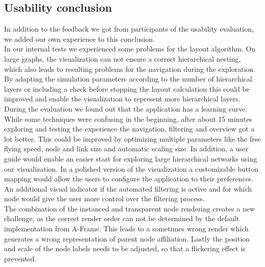 \subsection{Usability conclusion}
In addition to the feedback we got from participants of the usability evaluation, we added our own experience to this conclusion.
\\
In our internal tests we experienced some problems for the layout algorithm. 
On large graphs, the visualization can not ensure a correct hierarchical nesting, which also leads to resulting problems for the navigation during the exploration. 
By adapting the simulation parameters according to the number of hierarchical layers or including a check before stopping the layout calculation this could be improved and enable the visualization to represent more hierarchical layers.
\\
During the evaluation we found out that the application has a learning curve. 
While some techniques were confusing in the beginning, after about 15 minutes exploring and testing the experience the navigation, filtering and overview got a lot better.
This could be improved by optimizing multiple parameters like the free flying speed, node and link size and automatic scaling size. 
In addition, a user guide would enable an easier start for exploring large hierarchical networks using our visualization.
In a polished version of the visualization a customizable button mapping would allow the users to configure the application to their preferences.
An additional visual indicator if the automated filtering is active and for which node would give the user more control over the filtering process. 
\\
The combination of the instanced and transparent node rendering creates a new challenge, as the correct render order can not be determined by the default implementation from A-Frame. This leads to a sometimes wrong render which generates a wrong representation of parent node affiliation.
Lastly the position and scale of the node labels needs to be adjusted, so that a flickering effect is prevented.
